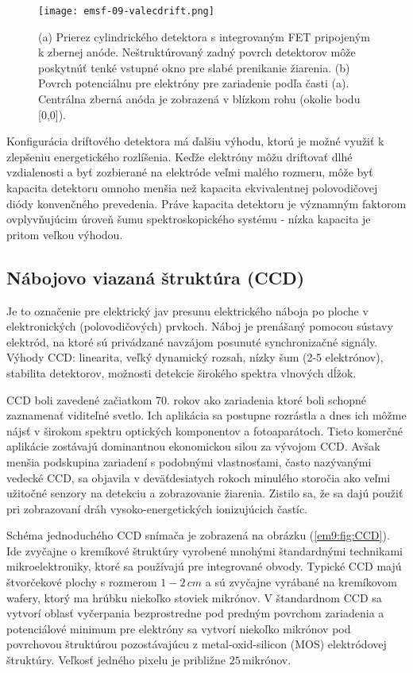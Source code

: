 \documentclass[../../main.tex]{subfiles}
\begin{document}
\begin{figure}[!h]
\texttt{[image: emsf-09-valecdrift.png]}
\centering
\caption{(a) Prierez cylindrického detektora s integrovaným FET pripojeným k zbernej anóde. Neštruktúrovaný zadný povrch detektorov môže poskytnúť tenké vstupné okno pre slabé prenikanie žiarenia. (b) Povrch potenciálnu pre elektróny pre zariadenie podľa časti (a). Centrálna zberná anóda je zobrazená v blízkom rohu (okolie bodu [0,0]).}
\label{em9:fig:valecdrift}
\end{figure}

Konfigurácia driftového detektora má ďalšiu výhodu, ktorú je možné využiť k zlepšeniu energetického rozlíšenia. Keďže elektróny môžu driftovať dlhé vzdialenosti a byť zozbierané na elektróde veľmi malého rozmeru, môže byť kapacita detektoru omnoho menšia než kapacita ekvivalentnej polovodičovej diódy konvenčného prevedenia. Práve kapacita detektoru je významným faktorom ovplyvňujúcim úroveň šumu spektroskopického systému - nízka kapacita je pritom veľkou výhodou.

\subsection{Nábojovo viazaná štruktúra (CCD)}
Je to označenie pre elektrický jav presunu elektrického náboja po ploche v elektronických (polovodičových) prvkoch. Náboj je prenášaný pomocou sústavy elektród, na ktoré sú privádzané navzájom posunuté synchronizačné signály. Výhody CCD: linearita, veľký dynamický rozsah, nízky šum (2-5 elektrónov), stabilita detektorov, možnosti detekcie širokého spektra vlnových dĺžok. 

CCD boli zavedené začiatkom 70. rokov ako zariadenia ktoré boli schopné zaznamenať viditeľné svetlo. Ich aplikácia sa postupne rozrástla a dnes ich môžme nájsť v širokom spektru optických komponentov a fotoaparátoch. Tieto komerčné aplikácie zostávajú dominantnou ekonomickou silou za vývojom CCD. Avšak menšia podskupina zariadení s podobnými vlastnosťami, často nazývanými vedecké CCD, sa objavila v deväťdesiatych rokoch minulého storočia ako veľmi užitočné senzory na detekciu a zobrazovanie žiarenia. Zistilo sa, že sa dajú použiť pri zobrazovaní dráh vysoko-energetických ionizujúcich častíc.

Schéma jednoduchého CCD snímača je zobrazená na obrázku (\ref{em9:fig:CCD}). Ide zvyčajne o kremíkové štruktúry vyrobené mnohými štandardnými technikami mikroelektroniky, ktoré sa používajú pre integrované obvody. Typické CCD majú štvorčekové plochy s rozmerom $1-2\,\unit{cm}$ a sú zvyčajne vyrábané na kremíkovom wafery, ktorý ma hrúbku niekoľko stoviek mikrónov. V štandardnom CCD sa vytvorí oblasť vyčerpania bezprostredne pod predným povrchom zariadenia a potenciálové minimum pre elektróny sa vytvorí niekoľko mikrónov pod povrchovou štruktúrou pozostávajúcu z metal-oxid-silicon (MOS) elektródovej štruktúry. Veľkosť jedného pixelu je približne $25\,$mikrónov. 
\end{document}
